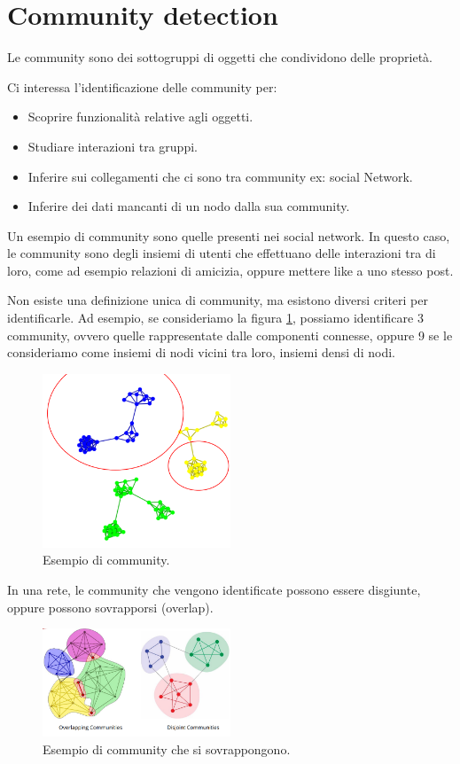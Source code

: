 \section{Community detection}
\begin{definizione}
    Le community sono dei sottogruppi di oggetti che condividono delle proprietà.
\end{definizione}
Ci interessa l'identificazione delle community per:
\begin{itemize}
    \item Scoprire funzionalità relative agli oggetti.
    \item Studiare interazioni tra gruppi.
    \item Inferire sui collegamenti che ci sono tra community ex: social Network.
    \item Inferire dei dati mancanti di un nodo dalla sua community.
\end{itemize}
\begin{esempio}
    Un esempio di community sono quelle presenti nei social network. In questo caso,
    le community sono degli insiemi di utenti che effettuano delle interazioni
    tra di loro, come ad esempio relazioni di amicizia, oppure mettere like a
    uno stesso post.
\end{esempio}
Non esiste una definizione unica di community, ma esistono diversi criteri per
identificarle. Ad esempio, se consideriamo la figura \ref{fig:community}, possiamo
identificare 3 community, ovvero quelle rappresentate dalle componenti connesse,
oppure 9 se le consideriamo come insiemi di nodi vicini tra loro, insiemi densi
di nodi.
\begin{figure}[!ht]
    \centering
    \includegraphics[width=0.5\textwidth]{./img/net/community.png}
    \caption{Esempio di community.}
    \label{fig:community}
\end{figure}

In una rete, le community che vengono identificate possono essere disgiunte,
oppure possono sovrapporsi (overlap).
\begin{figure}[!ht]
    \centering
    \includegraphics[width=0.5\textwidth]{./img/net/overlap.png}
    \caption{Esempio di community che si sovrappongono.}
    \label{fig:overlap}
\end{figure}
